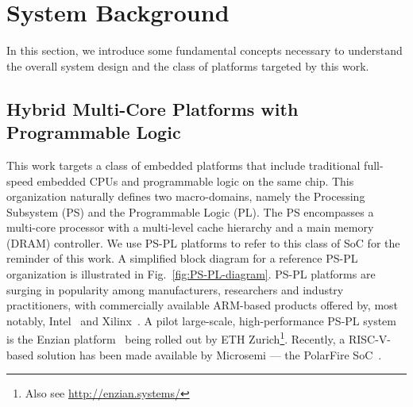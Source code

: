 \section{System Background}

In this section, we introduce some fundamental concepts necessary to
understand the overall system design and the class of platforms
targeted by this work.

\subsection{Hybrid Multi-Core Platforms with Programmable Logic}
This work targets a class of embedded platforms that include
traditional full-speed embedded CPUs and programmable logic on the
same chip. This organization naturally defines two macro-domains,
namely the Processing Subsystem (PS) and the Programmable Logic
(PL). The PS encompasses a multi-core processor with a multi-level
cache hierarchy and a main memory (DRAM) controller. We use PS-PL
platforms to refer to this class of SoC for the reminder of this
work. A simplified block diagram for a reference PS-PL organization is
illustrated in Fig.~\ref{fig:PS-PL-diagram}. PS-PL platforms are
surging in popularity among manufacturers, researchers and industry
practitioners, with commercially available ARM-based products offered
by, most notably, Intel~\cite{stratix10} and
Xilinx~\cite{ultrascale+}. A pilot large-scale, high-performance PS-PL
system is the Enzian platform~\cite{enzian20} being rolled out by ETH
Zurich\footnote{Also see \url{http://enzian.systems/}}. Recently, a
RISC-V-based solution has been made available by Microsemi --- the
PolarFire SoC~\cite{icikle_kit}. 


